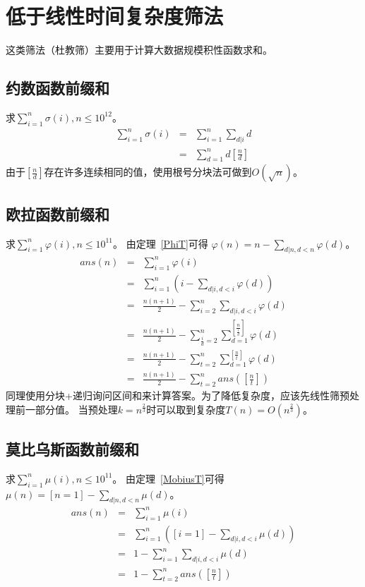 \section{低于线性时间复杂度筛法}
这类筛法（杜教筛）主要用于计算大数据规模积性函数求和。
\subsection{约数函数前缀和}
求$\displaystyle \sum_{i=1}^n{\sigma(i)},n\leq 10^{12}$。
\begin{eqnarray*}
	\sum_{i=1}^n{\sigma(i)}&=&\sum_{i=1}^n{\sum_{d|i}d}\\
	&=&\sum_{d=1}^n{d[\frac{n}{d}]}
\end{eqnarray*}
由于$[\frac{n}{d}]$存在许多连续相同的值，使用根号分块法可做到$O(\sqrt{n})$。
\subsection{欧拉函数前缀和}
求$\displaystyle \sum_{i=1}^n{\varphi(i)},n\leq 10^{11}$。
由定理~\ref{PhiT}可得
$\displaystyle \varphi(n)=n-\sum_{d|n,d<n}{\varphi(d)}$。
\begin{eqnarray*}
	ans(n)&=&\sum_{i=1}^n{\varphi(i)}\\
	&=&\sum_{i=1}^n{\left(i-\sum_{d|i,d<i}{\varphi(d)}\right)}\\
	&=&\frac{n(n+1)}{2}-\sum_{i=2}^{n}{\sum_{d|i,d<i}{\varphi(d)}}\\
	&=&\frac{n(n+1)}{2}-\sum_{\frac{i}{d}=2}^n
	{\sum_{d=1}^{[\frac{n}{\frac{i}{d}}]}{\varphi(d)}}\\
	&=&\frac{n(n+1)}{2}-\sum_{t=2}^n
	{\sum_{d=1}^{[\frac{n}{t}]}{\varphi(d)}}\\
	&=&\frac{n(n+1)}{2}-\sum_{t=2}^n{ans([\frac{n}{t}])}
\end{eqnarray*}
同理使用分块+递归询问区间和来计算答案。为了降低复杂度，应该先线性筛预处理前一部分值。
当预处理$k=n^\frac{2}{3}$时可以取到复杂度$T(n)=O(n^\frac{2}{3})$。
\subsection{莫比乌斯函数前缀和}
求$\displaystyle \sum_{i=1}^n{\mu(i)},n\leq 10^{11}$。
由定理~\ref{MobiusT}可得
$\displaystyle \mu(n)=[n=1]-\sum_{d|n,d<n}{\mu(d)}$。
\begin{eqnarray*}
	ans(n)&=&\sum_{i=1}^n{\mu(i)}\\
	&=&\sum_{i=1}^n{\left([i=1]-\sum_{d|i,d<i}{\mu(d)}\right)}\\
	&=&1-\sum_{i=1}^n{\sum_{d|i,d<i}{\mu(d)}}\\
	&=&1-\sum_{t=2}^n{ans([\frac{n}{t}])}
\end{eqnarray*}
